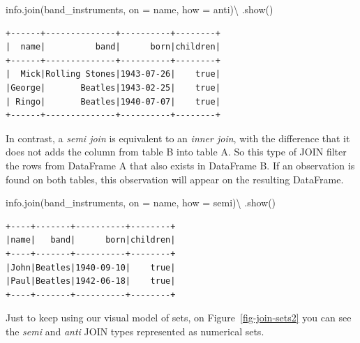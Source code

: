 \documentclass[
  11pt,
  letterpaper,
  DIV=11,
  numbers=noendperiod]{scrreprt}
\newenvironment{Shaded}{\begin{snugshade}}{\end{snugshade}}
\newcommand{\NormalTok}[1]{\textcolor[rgb]{0.00,0.23,0.31}{#1}}
\newcommand{\OperatorTok}[1]{\textcolor[rgb]{0.37,0.37,0.37}{#1}}
\newcommand{\StringTok}[1]{\textcolor[rgb]{0.13,0.47,0.30}{#1}}
\begin{document}
\begin{Shaded}
\begin{Highlighting}[]
\NormalTok{info.join(band\_instruments, on }\OperatorTok{=} \StringTok{\textquotesingle{}name\textquotesingle{}}\NormalTok{, how }\OperatorTok{=} \StringTok{\textquotesingle{}anti\textquotesingle{}}\NormalTok{)}\OperatorTok{\textbackslash{}}
\NormalTok{    .show()}
\end{Highlighting}
\end{Shaded}

\begin{verbatim}
+------+--------------+----------+--------+
|  name|          band|      born|children|
+------+--------------+----------+--------+
|  Mick|Rolling Stones|1943-07-26|    true|
|George|       Beatles|1943-02-25|    true|
| Ringo|       Beatles|1940-07-07|    true|
+------+--------------+----------+--------+
\end{verbatim}

In contrast, a \emph{semi join} is equivalent to an \emph{inner join},
with the difference that it does not adds the column from table B into
table A. So this type of JOIN filter the rows from DataFrame A that also
exists in DataFrame B. If an observation is found on both tables, this
observation will appear on the resulting DataFrame.

\begin{Shaded}
\begin{Highlighting}[]
\NormalTok{info.join(band\_instruments, on }\OperatorTok{=} \StringTok{\textquotesingle{}name\textquotesingle{}}\NormalTok{, how }\OperatorTok{=} \StringTok{\textquotesingle{}semi\textquotesingle{}}\NormalTok{)}\OperatorTok{\textbackslash{}}
\NormalTok{    .show()}
\end{Highlighting}
\end{Shaded}

\begin{verbatim}
+----+-------+----------+--------+
|name|   band|      born|children|
+----+-------+----------+--------+
|John|Beatles|1940-09-10|    true|
|Paul|Beatles|1942-06-18|    true|
+----+-------+----------+--------+
\end{verbatim}

Just to keep using our visual model of sets, on
Figure~\ref{fig-join-sets2} you can see the \emph{semi} and \emph{anti}
JOIN types represented as numerical sets.
\end{document}
